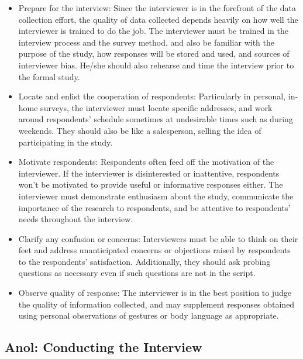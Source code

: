 \begin{itemize}
	\item Prepare for the interview: Since the interviewer is in the forefront of the data collection effort, the quality of data collected depends heavily on how well the interviewer is trained to do the job. The interviewer must be trained in the interview process and the survey method, and also be familiar with the purpose of the study, how responses will be stored and used, and sources of interviewer bias. He/she should also rehearse and time the interview prior to the formal study.
	\item Locate and enlist the cooperation of respondents: Particularly in personal, in-home surveys, the interviewer must locate specific addresses, and work around respondents’ schedule sometimes at undesirable times such as during weekends. They should also be like a salesperson, selling the idea of participating in the study.
	\item Motivate respondents: Respondents often feed off the motivation of the interviewer. If the interviewer is disinterested or inattentive, respondents won’t be motivated to provide useful or informative responses either. The interviewer must demonstrate enthusiasm about the study, communicate the importance of the research to respondents, and be attentive to respondents’ needs throughout the interview. 
	\item Clarify any confusion or concerns: Interviewers must be able to think on their feet and address unanticipated concerns or objections raised by respondents to the respondents’ satisfaction. Additionally, they should ask probing questions as necessary even if such questions are not in the script.
	\item Observe quality of response: The interviewer is in the best position to judge the quality of information collected, and may supplement responses obtained using personal observations of gestures or body language as appropriate.
\end{itemize}

\subsection{Anol: Conducting the Interview}


